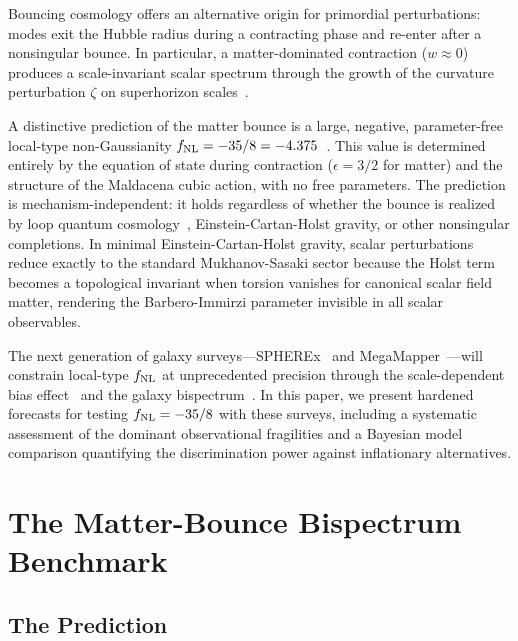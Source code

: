 \documentclass[a4paper,11pt]{article}
\newcommand{\fnl}{f_{\rm NL}}
\begin{document}
Bouncing cosmology offers an alternative origin for primordial perturbations: modes exit the Hubble radius during a contracting phase and re-enter after a nonsingular bounce. In particular, a matter-dominated contraction ($w \approx 0$) produces a scale-invariant scalar spectrum through the growth of the curvature perturbation $\zeta$ on superhorizon scales~\citep{Wands:1998yp,Finelli:2001sr}.

A distinctive prediction of the matter bounce is a large, negative, parameter-free local-type non-Gaussianity $\fnl = -35/8 = -4.375$~\citep{Cai:2009fn}. This value is determined entirely by the equation of state during contraction ($\epsilon = 3/2$ for matter) and the structure of the Maldacena cubic action, with no free parameters. The prediction is mechanism-independent: it holds regardless of whether the bounce is realized by loop quantum cosmology~\citep{WilsonEwing:2012}, Einstein-Cartan-Holst gravity, or other nonsingular completions. In minimal Einstein-Cartan-Holst gravity, scalar perturbations reduce exactly to the standard Mukhanov-Sasaki sector because the Holst term becomes a topological invariant when torsion vanishes for canonical scalar field matter, rendering the Barbero-Immirzi parameter invisible in all scalar observables.

The next generation of galaxy surveys---SPHEREx~\citep{Dore:2014} and
MegaMapper~\citep{Schlegel:2022}---will constrain local-type $\fnl$ at
unprecedented precision through the scale-dependent bias
effect~\citep{Dalal:2007cu} and the galaxy
bispectrum~\citep{Heinrich:2023}. In this paper, we present hardened
forecasts for testing $\fnl = -35/8$ with these surveys, including a
systematic assessment of the dominant observational fragilities and a
Bayesian model comparison quantifying the discrimination power against
inflationary alternatives.

\section{The Matter-Bounce Bispectrum Benchmark}
\label{sec:benchmark}

\subsection{The Prediction}
\end{document}
